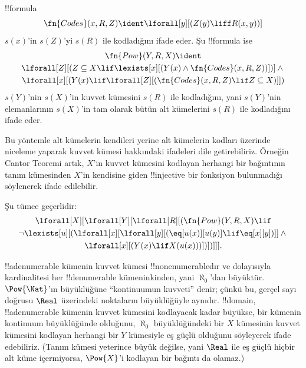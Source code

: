 \begin{prop}
!!{formula}
  \[
  \fn{Codes}(x, R, Z) \ident \lforall[y][(Z(y) \liff
    R(x, y))]
  \]
$s(x)$'in $s(Z)$'yi $s(R)$ ile kodladığını ifade eder. Şu
!!{formula} ise
\begin{multline*}
  \fn{Pow}(Y, R, X) \ident \\
  \lforall[Z][(Z \subseteq X \lif \lexists[x][(Y(x) \land
    \fn{Codes}(x, R, Z))])] \land {} \\ \lforall[x][(Y(x) \lif
  \lforall[Z][(\fn{Codes}(x, R, Z) \lif Z \subseteq X)]])
\end{multline*}
$s(Y)$'nin $s(X)$'in kuvvet kümesini $s(R)$ ile kodladığını, yani $s(Y)$'nin
elemanlarının $s(X)$'in tam olarak bütün alt kümelerini $s(R)$ ile
kodladığını ifade eder.
\end{prop}

\begin{explain}
Bu yöntemle alt kümelerin kendileri yerine alt kümelerin kodları üzerinde
niceleme yaparak kuvvet kümesi hakkındaki ifadeleri dile getirebiliriz.
Örneğin Cantor Teoremi artık, $X$'in kuvvet kümesini kodlayan herhangi bir
bağıntının tanım kümesinden $X$'in kendisine giden !!{injective} bir fonksiyon
bulunmadığı söylenerek ifade edilebilir.
\end{explain}

\begin{prop}
Şu tümce geçerlidir:
\begin{multline*}
  \lforall[X][\lforall[Y][\lforall[R][(\fn{Pow}(Y, R, X) \lif \\
      \lnot \lexists[u][(\lforall[x][\lforall[y][(\eq[u(x)][u(y)] \lif
            \eq[x][y])]] \land {}\\
        \lforall[x][(Y(x) \lif X(u(x)))])])]]].
\end{multline*}
\end{prop}

\begin{explain}
!!a{denumerable} kümenin kuvvet kümesi !!{nonenumerable}{}dır ve dolayısıyla
kardinalitesi her !!{denumerable} kümeninkinden, yani $\aleph_0$'dan
büyüktür. $\Pow{\Nat}$'ın büyüklüğüne ``kontinuumun kuvveti'' denir; çünkü
bu, gerçel sayı doğrusu $\Real$ üzerindeki noktaların büyüklüğüyle aynıdır.
!!{domain}, !!a{denumerable} kümenin kuvvet kümesini kodlayacak kadar
büyükse, bir kümenin kontinuum büyüklüğünde olduğunu, $\aleph_0$
büyüklüğündeki bir $X$ kümesinin kuvvet kümesini kodlayan herhangi bir $Y$
kümesiyle eş güçlü olduğunu söyleyerek ifade edebiliriz. (Tanım kümesi yeterince
büyük değilse, yani $\Real$ ile eş güçlü hiçbir alt küme içermiyorsa,
$\Pow{X}$'i kodlayan bir bağıntı da olamaz.)
\end{explain}

